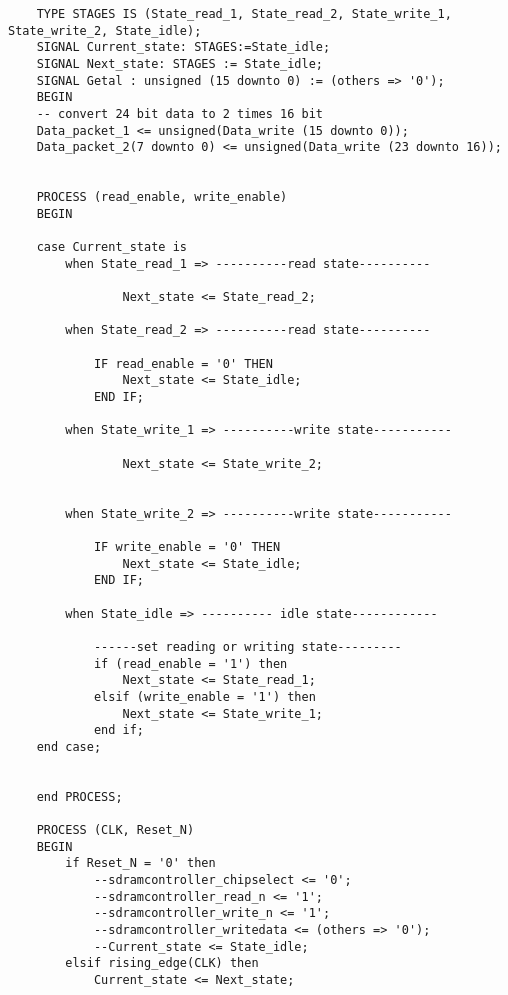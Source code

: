 \begin{lstlisting}
    TYPE STAGES IS (State_read_1, State_read_2, State_write_1, State_write_2, State_idle);
    SIGNAL Current_state: STAGES:=State_idle;
    SIGNAL Next_state: STAGES := State_idle;
    SIGNAL Getal : unsigned (15 downto 0) := (others => '0');
    BEGIN
    -- convert 24 bit data to 2 times 16 bit
    Data_packet_1 <= unsigned(Data_write (15 downto 0));
    Data_packet_2(7 downto 0) <= unsigned(Data_write (23 downto 16));
    
    
    PROCESS (read_enable, write_enable)
    BEGIN
    
    case Current_state is
        when State_read_1 => ----------read state----------
            
                Next_state <= State_read_2;
            
        when State_read_2 => ----------read state----------
            
            IF read_enable = '0' THEN
                Next_state <= State_idle;
            END IF;
            
        when State_write_1 => ----------write state-----------
            
                Next_state <= State_write_2;
    
            
        when State_write_2 => ----------write state-----------
            
            IF write_enable = '0' THEN
                Next_state <= State_idle;
            END IF;
            
        when State_idle => ---------- idle state------------
    
            ------set reading or writing state---------
            if (read_enable = '1') then
                Next_state <= State_read_1;
            elsif (write_enable = '1') then
                Next_state <= State_write_1;
            end if;
    end case;
    
    
    end PROCESS;
    
    PROCESS (CLK, Reset_N)
    BEGIN
        if Reset_N = '0' then
            --sdramcontroller_chipselect <= '0';
            --sdramcontroller_read_n <= '1';
            --sdramcontroller_write_n <= '1';
            --sdramcontroller_writedata <= (others => '0');
            --Current_state <= State_idle;
        elsif rising_edge(CLK) then
            Current_state <= Next_state;
    

\end{lstlisting}
